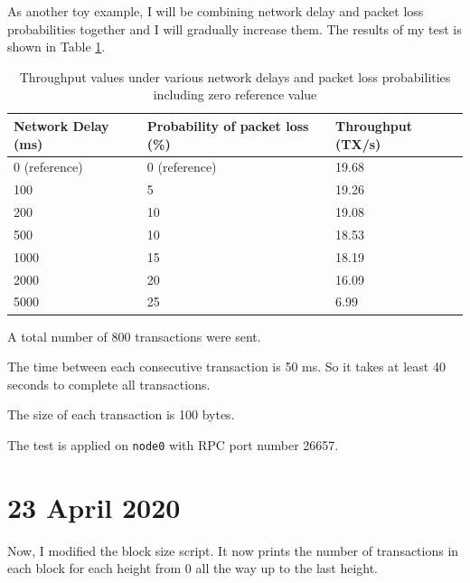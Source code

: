 \documentclass{article}
\begin{document}
As another toy example, I will be combining network delay and packet loss probabilities together and I will gradually increase them. The results of my test is shown in Table \ref{tab:Network delay + Packet Loss combined}.

\begin{table}[ht]
    \begin{threeparttable}
        \caption{Throughput values under various network delays and packet loss probabilities including zero reference value}
        \centering
        \begin{tabular}{|l|l|l|}
            \hline
            \textbf{Network Delay (ms)} & \textbf{Probability of packet loss (\%)} & \textbf{Throughput (TX/s)} \\ \hline
            0 (reference)               & 0 (reference)        & 19.68                       \\ \hline
            100                         &  5                   & 19.26                       \\ \hline
            200                         & 10                   & 19.08                       \\ \hline
            500                         & 10                   & 18.53                       \\ \hline
            1000                        & 15                   & 18.19                       \\ \hline
            2000                        & 20                   & 16.09                       \\ \hline
            5000                        & 25                   & 6.99                       \\ \hline
        \end{tabular}
        \label{tab:Network delay + Packet Loss combined}
        \begin{tablenotes}
            \item[1] A total number of 800 transactions were sent.
            \item[2] The time between each consecutive transaction is 50 ms. So it takes at least 40 seconds to complete all transactions.
            \item[3] The size of each transaction is 100 bytes.
            \item[4] The test is applied on \texttt{node0} with RPC port number 26657.
        \end{tablenotes}
    \end{threeparttable}
\end{table}

\section*{23 April 2020}

Now, I modified the block size script. It now prints the number of transactions in each block for each height from 0 all the way up to the last height.
\end{document}
